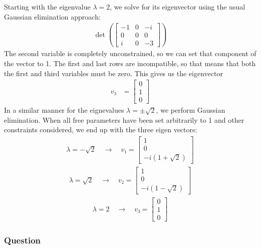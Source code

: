 Starting with the eigenvalue $λ=2$, we solve for its eigenvector using the
usual Gaussian elimination approach:
\begin{align*}
    \det ( \begin{bmatrix}
	-1  & 0   & -i   \\
	0   & 0   & 0    \\
	i   & 0   & -3
    \end{bmatrix} )
\end{align*}
The second variable is completely unconstrained, so we can set that component
of the vector to 1. The first and last rows are incompatible, so that means
that both the first and third variables must be zero. This gives us the
eigenvector
\begin{align*}
    v₃ &= \begin{bmatrix} 0 \\ 1 \\ 0 \end{bmatrix}
\end{align*}
In a similar manner for the eignevalues $λ = ±\sqrt 2$, we perform Gaussian
elimination. When all free parameters have been set arbitrarily to 1 and other
constraints considered, we end up with the three eigen vectors:
\begin{align}
    \boxed{ λ = -\sqrt 2 \quad\rightarrow\quad v₁ =
	\begin{bmatrix} 1 \\ 0 \\ -i(1+\sqrt 2) \end{bmatrix} }
\end{align}
\begin{align}
    \boxed{ λ = \sqrt2 \quad\rightarrow\quad v₂ =
	\begin{bmatrix} 1 \\ 0 \\ -i(1-\sqrt 2) \end{bmatrix} }
\end{align}
\begin{align}
    \boxed{ λ = 2 \quad\rightarrow\quad v₃ =
	\begin{bmatrix} 0 \\ 1 \\ 0 \end{bmatrix} }
\end{align}

\subsubsection{Question}

